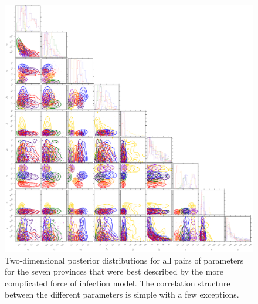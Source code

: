 \documentclass[nofootinbib,aps,pre,twocolumn,superscriptaddress,showkeys,showpacs]{revtex4-1}
\begin{document}
\begin{figure}
\includegraphics[width=\textwidth,angle=0]{figures/cornerplot.png}
\caption{\label{fig:cornerplot}  Two-dimensional posterior distributions for all pairs of parameters for the seven provinces that were best described by the more complicated force of infection model. The correlation structure between the different parameters is simple with a few exceptions.}
\end{figure}




\end{document}
